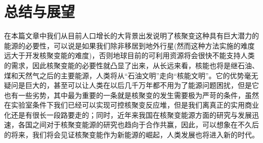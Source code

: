 \chapter{总结与展望}
在本篇文章中我们从目前人口增长的大背景出发说明了核聚变这种具有巨大潜力的能源的必要性，可以说是如果我们除非移居到地外行星(然而这种方法实施的难度远大于开发核聚变能的难度)，否则地球目前的可利用资源将会很快不能支持人类的需求，因此核聚变能的必要性就凸显了出来，从长远来看，核能也将是继石油、煤和天然气之后的主要能源，人类将从“石油文明”走向“核能文明”。它的优势毫无疑问是巨大的，甚至可以让人类在以后几千万年都不用为了能源问题困扰，但是它也有一些劣势，其中最为重要的一条就是核聚变的发生需要极为严苛的条件，虽然在实验室条件下我们已经可以实现可控核聚变反应堆，但是我们离真正的实用商业化还是有很长一段路要走的；同时，近年来我国在核聚变能源方面的研究与发展迅速，各国之间对于核聚变能源的研究也趋向于合作共赢，因此，可以想象在不久后的将来，我们将会见证核聚变能作为新能源的崛起，人类发展也将进入新的时代。
